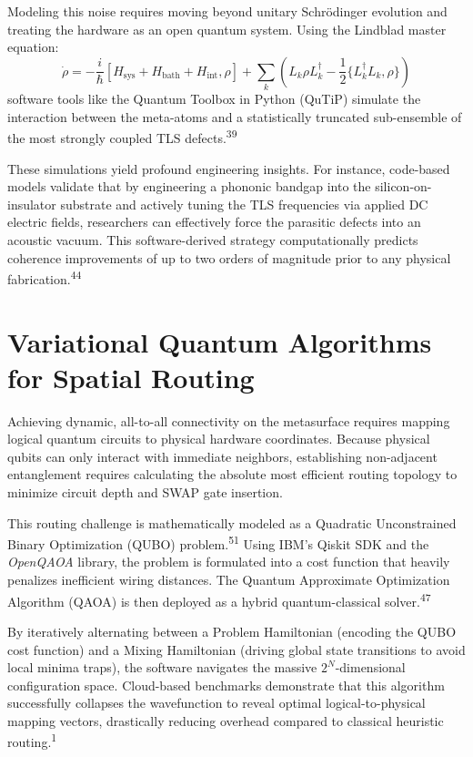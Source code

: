 \documentclass[11pt, a4paper]{article}
\begin{document}
Modeling this noise requires moving beyond unitary Schr\"odinger evolution and treating the hardware as an open quantum system. Using the Lindblad master equation:
\begin{equation}
\dot{\rho} = -\frac{i}{\hbar}[H_{\text{sys}} + H_{\text{bath}} + H_{\text{int}}, \rho] + \sum_k \left( L_k \rho L_k^\dagger - \frac{1}{2}\{L_k^\dagger L_k, \rho\} \right)
\end{equation}
software tools like the Quantum Toolbox in Python (QuTiP) simulate the interaction between the meta-atoms and a statistically truncated sub-ensemble of the most strongly coupled TLS defects.\textsuperscript{39}

These simulations yield profound engineering insights. For instance, code-based models validate that by engineering a phononic bandgap into the silicon-on-insulator substrate and actively tuning the TLS frequencies via applied DC electric fields, researchers can effectively force the parasitic defects into an acoustic vacuum. This software-derived strategy computationally predicts coherence improvements of up to two orders of magnitude prior to any physical fabrication.\textsuperscript{44}

\section{Variational Quantum Algorithms for Spatial Routing}

Achieving dynamic, all-to-all connectivity on the metasurface requires mapping logical quantum circuits to physical hardware coordinates. Because physical qubits can only interact with immediate neighbors, establishing non-adjacent entanglement requires calculating the absolute most efficient routing topology to minimize circuit depth and SWAP gate insertion.

This routing challenge is mathematically modeled as a Quadratic Unconstrained Binary Optimization (QUBO) problem.\textsuperscript{51} Using IBM's Qiskit SDK and the \textit{OpenQAOA} library, the problem is formulated into a cost function that heavily penalizes inefficient wiring distances. The Quantum Approximate Optimization Algorithm (QAOA) is then deployed as a hybrid quantum-classical solver.\textsuperscript{47}

By iteratively alternating between a Problem Hamiltonian (encoding the QUBO cost function) and a Mixing Hamiltonian (driving global state transitions to avoid local minima traps), the software navigates the massive $2^N$-dimensional configuration space. Cloud-based benchmarks demonstrate that this algorithm successfully collapses the wavefunction to reveal optimal logical-to-physical mapping vectors, drastically reducing overhead compared to classical heuristic routing.\textsuperscript{1}
\end{document}
